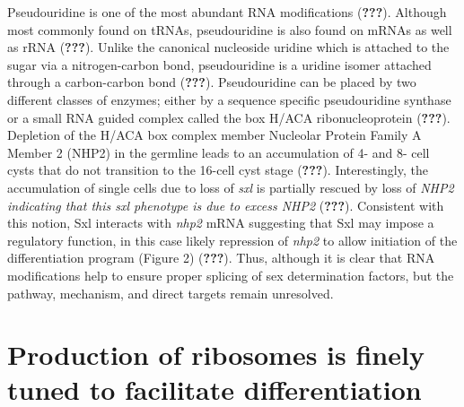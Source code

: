 \documentclass[12pt,oneside]{reedthesis}
\begin{document}
Pseudouridine is one of the most abundant RNA modifications
({\textbf{???}}). Although most commonly found on tRNAs, pseudouridine is
also found on mRNAs as well as rRNA ({\textbf{???}}). Unlike the
canonical nucleoside uridine which is attached to the sugar via a
nitrogen-carbon bond, pseudouridine is a uridine isomer attached through
a carbon-carbon bond ({\textbf{???}}). Pseudouridine can be placed by two
different classes of enzymes; either by a sequence specific
pseudouridine synthase or a small RNA guided complex called the box
H/ACA ribonucleoprotein ({\textbf{???}}). Depletion of the H/ACA box
complex member Nucleolar Protein Family A Member 2 (NHP2) in the
germline leads to an accumulation of 4- and 8- cell cysts that do not
transition to the 16-cell cyst stage ({\textbf{???}}). Interestingly,
the accumulation of single cells due to loss of \emph{sxl} is partially
rescued by loss of \emph{NHP2 indicating that this sxl phenotype is due to
excess NHP2} ({\textbf{???}}). Consistent with this notion, Sxl
interacts with \emph{nhp2} mRNA suggesting that Sxl may impose a regulatory
function, in this case likely repression of \emph{nhp2} to allow initiation
of the differentiation program (Figure 2) ({\textbf{???}}). Thus,
although it is clear that RNA modifications help to ensure proper
splicing of sex determination factors, but the pathway, mechanism, and
direct targets remain unresolved.

\hypertarget{production-of-ribosomes-is-finely-tuned-to-facilitate-differentiation}{%
\section{Production of ribosomes is finely tuned to facilitate differentiation}\label{production-of-ribosomes-is-finely-tuned-to-facilitate-differentiation}}
\end{document}
